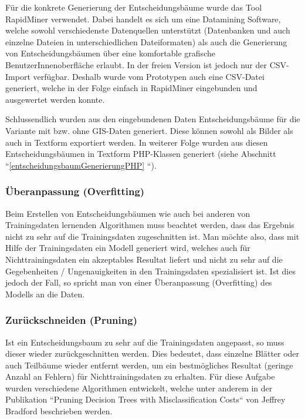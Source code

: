 Für die konkrete Generierung der Entscheidungsbäume wurde das Tool RapidMiner verwendet. Dabei handelt es sich um eine Datamining Software, welche sowohl verschiedenste Datenquellen unterstützt (Datenbanken und auch einzelne Dateien in unterschiedlichen Dateiformaten) als auch die Generierung von Entscheidungsbäumen über eine komfortable grafische BenutzerInnenoberfläche erlaubt. In der freien Version ist jedoch nur der CSV-Import verfügbar. Deshalb wurde vom Prototypen auch eine CSV-Datei generiert, welche in der Folge einfach in RapidMiner eingebunden und ausgewertet werden konnte. 

Schlussendlich wurden aus den eingebundenen Daten Entscheidungsbäume für die Variante mit bzw. ohne GIS-Daten generiert. Diese können sowohl als Bilder als auch in Textform exportiert werden. In weiterer Folge wurden aus diesen Entscheidungsbäumen in Textform PHP-Klassen generiert (siehe Abschnitt ``\ref{entscheidungsbaumGenerierungPHP} ``).

\subsubsection{Überanpassung (Overfitting)}
Beim Erstellen von Entscheidungsbäumen wie auch bei anderen von Trainingsdaten lernenden Algorithmen muss beachtet werden, dass das Ergebnis nicht zu sehr auf die Trainingsdaten zugeschnitten ist. Man möchte also, dass mit Hilfe der Trainingsdaten ein Modell generiert wird, welches auch für Nichttrainingsdaten ein akzeptables Resultat liefert und nicht zu sehr auf die Gegebenheiten / Ungenauigkeiten in den Trainingsdaten spezialisiert ist. Ist dies jedoch der Fall, so spricht man von einer Überanpassung (Overfitting) des Modells an die Daten.  \cite{tom_dietterich_overfitting_1995}

\subsubsection{Zurückschneiden (Pruning)}
Ist ein Entscheidungsbaum zu sehr  auf die Trainingsdaten angepasst, so muss dieser wieder zurückgeschnitten werden. Dies bedeutet, dass einzelne Blätter oder auch Teilbäume wieder entfernt werden, um ein bestmögliches Resultat (geringe Anzahl an Fehlern) für Nichttrainingsdaten zu erhalten. Für diese Aufgabe wurden verschiedene Algorithmen entwickelt, welche unter anderem in der Publikation ``Pruning Decision Trees with Misclassification Costs`` von Jeffrey Bradford beschrieben werden. \cite{jeffrey_p._bradford_pruning_1998}

